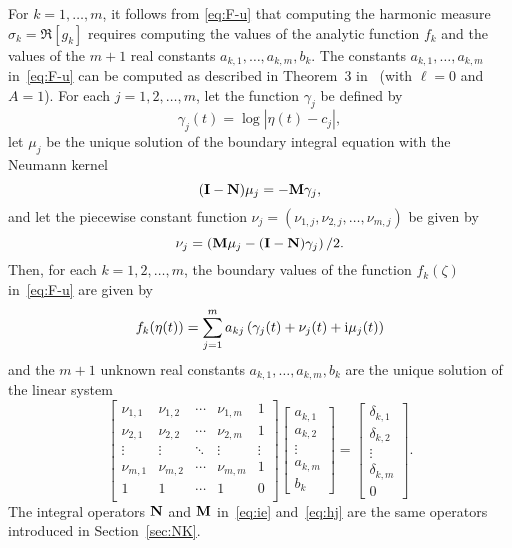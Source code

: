 For $k=1,\ldots,m$, it follows from \eqref{eq:F-u} that computing the harmonic measure $\sigma_k=\Re[g_k]$ requires computing the values of the analytic function $f_k$ and the values of the $m+1$ real constants $a_{k,1},\ldots,a_{k,m},b_k$. The constants $a_{k,1},\ldots,a_{k,m}$ in~\eqref{eq:F-u} can be computed as described in Theorem~3 in~\cite{Nvm} (with $\ell=0$ and $A=1$). 
For each $j=1,2,\ldots,m$, let the function $\gamma_j$ be defined by
\begin{equation}\label{eq:gam-j}
\gamma_j(t)=\log|\eta(t)-c_j|,
\end{equation}
let $\mu_j$ be the unique solution of the boundary integral equation with the Neumann kernel
\begin{equation}\label{eq:ie}
({\bf I}-{\bf N})\mu_j=-{\bf M}\gamma_j,
\end{equation}
and let the piecewise constant function $\nu_j=(\nu_{1,j},\nu_{2,j},\ldots,\nu_{m,j})$ be given by
\begin{equation}\label{eq:hj}
\nu_j=\left({\bf M}\mu_j-({\bf I}-{\bf N})\gamma_j\right)/2.
\end{equation}
Then, for each $k=1,2,\ldots,m$, the boundary values of the function $f_k(\zeta)$ in~\eqref{eq:F-u} are given by
\begin{equation}\label{eq:fk}
f_k(\eta(t))=\sum_{j=1}^m a_{kj}\left(\gamma_j(t)+\nu_j(t)+\mathrm{i}\mu_j(t)\right)
\end{equation}
and the $m+1$ unknown real constants $a_{k,1},\ldots,a_{k,m},b_k$ are the unique solution of the linear system
\begin{equation}\label{eq:sys-method}
\left[\begin{array}{ccccc}
\nu_{1,1}    &\nu_{1,2}    &\cdots &\nu_{1,m}      &1       \\
\nu_{2,1}    &\nu_{2,2}    &\cdots &\nu_{2,m}      &1       \\
\vdots     &\vdots     &\ddots &\vdots       &\vdots  \\
\nu_{m,1}    &\nu_{m,2}    &\cdots &\nu_{m,m}      &1       \\
1          &1          &\cdots &1            &0       \\
\end{array}\right]
\left[\begin{array}{c}
a_{k,1}    \\a_{k,2}    \\ \vdots \\ a_{k,m} \\  b_k 
\end{array}\right]
= \left[\begin{array}{c}
\delta_{k,1} \\  \delta_{k,2} \\  \vdots \\ \delta_{k,m} \\ 0  
\end{array}\right].
\end{equation}
The integral operators ${\bf N}$ and ${\bf M}$ in~\eqref{eq:ie} and~\eqref{eq:hj} are the same operators introduced in Section~\ref{sec:NK}.

